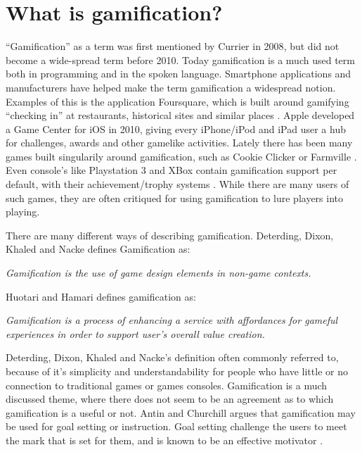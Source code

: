 \section{What is gamification?}
\label{sec:gamification}

``Gamification'' as a term was first mentioned by Currier in 2008\cite{gamificationcurrier}, but did not become a wide-spread term before 2010. Today gamification is a much used term both in programming and in the spoken language. Smartphone applications and manufacturers have helped make the term gamification a widespread notion. Examples of this is the application Foursquare, which is built around gamifying ``checking in'' at restaurants, historical sites and similar places \cite{foursquare}. Apple developed a Game Center for iOS in 2010, giving every iPhone/iPod and iPad user a hub for challenges, awards and other gamelike activities\cite{applegamecenter}. Lately there has been many games built singularily around gamification, such as Cookie Clicker \cite{cookieclicker} or Farmville \cite{farmville}. Even console's like Playstation 3 and XBox contain gamification support per default, with their achievement/trophy systems \cite{xbox, playstation}. While there are many users of such games, they are often critiqued for using gamification to lure players into playing. 


There are many different ways of describing gamification. Deterding, Dixon, Khaled and Nacke\cite{Deterding:2011:GDE:2181037.2181040} defines Gamification as:

\textit{Gamification is the use of game design elements in non-game
contexts.}

Huotari and Hamari\cite{huotari2012defining} defines gamification as:

\textit{Gamification is a process of enhancing a service with affordances for gameful experiences in order to support user's overall value creation.}

Deterding, Dixon, Khaled and Nacke's definition often commonly referred to, because of it's simplicity and understandability for people who have little or no connection to traditional games or games consoles.
Gamification is a much discussed theme, where there does not seem to be an agreement as to which gamification is a useful or not. 
Antin and Churchill\cite{antin2011badges} argues that gamification may be used for goal setting or instruction. Goal setting challenge the users to meet the mark that is set for them, and is known to be an effective motivator \cite{ling2005using}. 

